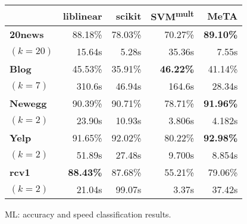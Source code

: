 \begin{figure}[t]
\centering
{\small
\begin{tabular}{|l|r|r|r|r|}
  \hline
  & \textbf{liblinear} & \textbf{scikit} &
  \textbf{SVM\textsuperscript{mult}} & \textbf{MeTA}\\\hline
  \textbf{20news}                    & 88.18\%          & 78.03\%  & 70.27\%          & \textbf{89.10\%}\\
  $(k=20)$                           & 15.64s           & 5.28s    & 35.36s           & 7.55s\\\hline
  \textbf{Blog}                      & 45.53\%          & 35.91\%  & \textbf{46.22\%} & 41.14\%\\
  $(k=7)$                            & 310.6s           & 46.94s   & 164.6s           & 28.34s\\\hline
  \textbf{Newegg}                    & 90.39\%          & 90.71\%  & 78.71\%          & \textbf{91.96\%}\\
  $(k=2)$                            & 23.90s           & 10.93s   & 3.806s           & 4.182s\\\hline
  \textbf{Yelp}                      & 91.65\%          & 92.02\%  & 80.22\%          & \textbf{92.98\%}\\
  $(k=2)$                            & 51.89s           & 27.48s   & 9.700s           & 8.854s\\\hline
  \textbf{rcv1}                      & \textbf{88.43\%} & 87.68\%  & 55.21\%          & 79.06\%\\
  $(k=2)$                            & 21.04s           & 99.07s   & 3.37s            & 37.42s\\\hline
\end{tabular}
}
\caption{ML: accuracy and speed classification results.}
\label{fig:ml-exp}
\end{figure}
